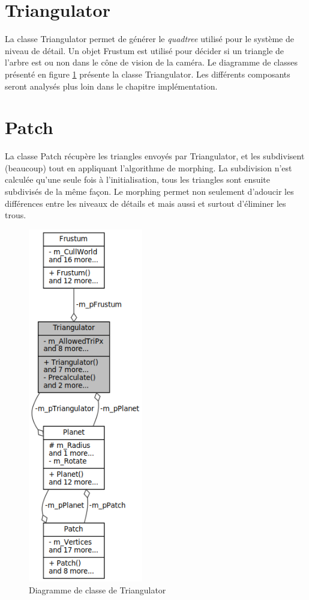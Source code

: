   \section{Triangulator}
  La classe Triangulator permet de générer le \emph{quadtree} utilisé pour le système de niveau de détail.
  Un objet Frustum est utilisé pour décider si un triangle de l'arbre est ou non dans le cône 
  de vision de la caméra. Le diagramme de classes présenté en figure \ref{fig:plan} présente la classe
  Triangulator. Les différents composants seront analysés plus loin dans le chapitre implémentation.
  
  \section{Patch}
  La classe Patch récupère les triangles envoyés par Triangulator, et les subdivisent (beaucoup) tout en appliquant l'algorithme de morphing. La subdivision n'est calculée qu'une seule fois à l'initialisation, tous les triangles sont ensuite subdivisés de la même façon. Le morphing permet non seulement d'adoucir les différences entre les niveaux de détails et mais aussi et surtout d'éliminer les trous.
  
  
  \begin{figure}
  \centering
  \includegraphics[width=5cm]{img/tri_class2.png}
  \caption{Diagramme de classe de Triangulator}
  \label{fig:plan}
  \end{figure}
  
